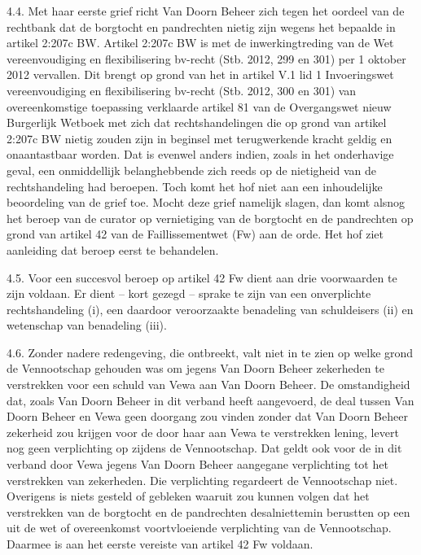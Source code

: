 \documentclass[
  dutch,
  a4paper,
]{article}
\begin{document}
4.4. Met haar eerste grief richt Van Doorn Beheer zich tegen het oordeel van de rechtbank dat de borgtocht en pandrechten nietig zijn wegens het bepaalde in artikel 2:207c BW. Artikel 2:207c BW is met de inwerkingtreding van de Wet vereenvoudiging en flexibilisering bv-recht (Stb. 2012, 299 en 301) per 1 oktober 2012 vervallen. Dit brengt op grond van het in artikel V.1 lid 1 Invoeringswet vereenvoudiging en flexibilisering bv-recht (Stb. 2012, 300 en 301) van overeenkomstige toepassing verklaarde artikel 81 van de Overgangswet nieuw Burgerlijk Wetboek met zich dat rechtshandelingen die op grond van artikel 2:207c BW nietig zouden zijn in beginsel met terugwerkende kracht geldig en onaantastbaar worden. Dat is evenwel anders indien, zoals in het onderhavige geval, een onmiddellijk belanghebbende zich reeds op de nietigheid van de rechtshandeling had beroepen. Toch komt het hof niet aan een inhoudelijke beoordeling van de grief toe. Mocht deze grief namelijk slagen, dan komt alsnog het beroep van de curator op vernietiging van de borgtocht en de pandrechten op grond van artikel 42 van de Faillissementwet (Fw) aan de orde. Het hof ziet aanleiding dat beroep eerst te behandelen.

4.5. Voor een succesvol beroep op artikel 42 Fw dient aan drie voorwaarden te zijn voldaan. Er dient -- kort gezegd -- sprake te zijn van een onverplichte rechtshandeling (i), een daardoor veroorzaakte benadeling van schuldeisers (ii) en wetenschap van benadeling (iii).

4.6. Zonder nadere redengeving, die ontbreekt, valt niet in te zien op welke grond de Vennootschap gehouden was om jegens Van Doorn Beheer zekerheden te verstrekken voor een schuld van Vewa aan Van Doorn Beheer. De omstandigheid dat, zoals Van Doorn Beheer in dit verband heeft aangevoerd, de deal tussen Van Doorn Beheer en Vewa geen doorgang zou vinden zonder dat Van Doorn Beheer zekerheid zou krijgen voor de door haar aan Vewa te verstrekken lening, levert nog geen verplichting op zijdens de Vennootschap. Dat geldt ook voor de in dit verband door Vewa jegens Van Doorn Beheer aangegane verplichting tot het verstrekken van zekerheden. Die verplichting regardeert de Vennootschap niet. Overigens is niets gesteld of gebleken waaruit zou kunnen volgen dat het verstrekken van de borgtocht en de pandrechten desalniettemin berustten op een uit de wet of overeenkomst voortvloeiende verplichting van de Vennootschap. Daarmee is aan het eerste vereiste van artikel 42 Fw voldaan.
\end{document}
